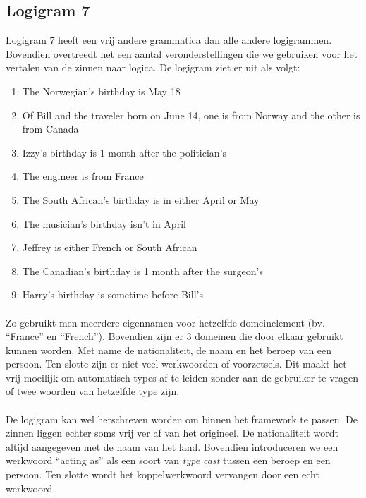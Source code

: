 \subsection{Logigram 7}
Logigram 7 heeft een vrij andere grammatica dan alle andere logigrammen. Bovendien overtreedt het een aantal veronderstellingen die we gebruiken voor het vertalen van de zinnen naar logica. De logigram ziet er uit als volgt:
\begin{enumerate}
  \item The Norwegian's birthday is May 18
  \item Of Bill and the traveler born on June 14, one is from Norway and the other is from Canada
  \item Izzy's birthday is 1 month after the politician's
  \item The engineer is from France
  \item The South African's birthday is in either April or May
  \item The musician's birthday isn't in April
  \item Jeffrey is either French or South African
  \item The Canadian's birthday is 1 month after the surgeon's
  \item Harry's birthday is sometime before Bill's
\end{enumerate}

\paragraph{} Zo gebruikt men meerdere eigennamen voor hetzelfde domeinelement (bv. ``France'' en ``French''). Bovendien zijn er 3 domeinen die door elkaar gebruikt kunnen worden. Met name de nationaliteit, de naam en het beroep van een persoon. Ten slotte zijn er niet veel werkwoorden of voorzetsels. Dit maakt het vrij moeilijk om automatisch types af te leiden zonder aan de gebruiker te vragen of twee woorden van hetzelfde type zijn.

\paragraph{} De logigram kan wel herschreven worden om binnen het framework te passen. De zinnen liggen echter soms vrij ver af van het origineel. De nationaliteit wordt altijd aangegeven met de naam van het land. Bovendien introduceren we een werkwoord ``acting as'' als een soort van \textit{type cast} tussen een beroep en een persoon. Ten slotte wordt het koppelwerkwoord vervangen door een echt werkwoord.

